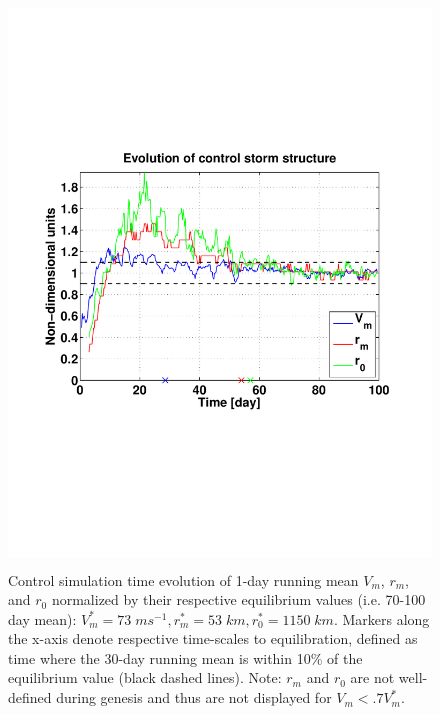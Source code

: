 \documentclass[12pt]{article}
\begin{document}
\begin{figure}[h!]
\centering
  \noindent\includegraphics[width=15cm,height=15cm]{FIGURES/Control_run.pdf}
\caption{Control simulation time evolution of 1-day running mean $V_m$, $r_m$, and $r_0$ normalized by their respective equilibrium values (i.e. 70-100 day mean): $V^*_m = 73 \; ms^{-1}, r^*_m = 53 \; km, r^*_0 = 1150 \; km$. Markers along the x-axis denote respective time-scales to equilibration, defined as time where the 30-day running mean is within 10\% of the equilibrium value (black dashed lines). Note: $r_m$ and $r_0$ are not well-defined during genesis and thus are not displayed for $V_m<.7V^*_m$.}
\label{fig:timeseries}
\end{figure}
\end{document}

